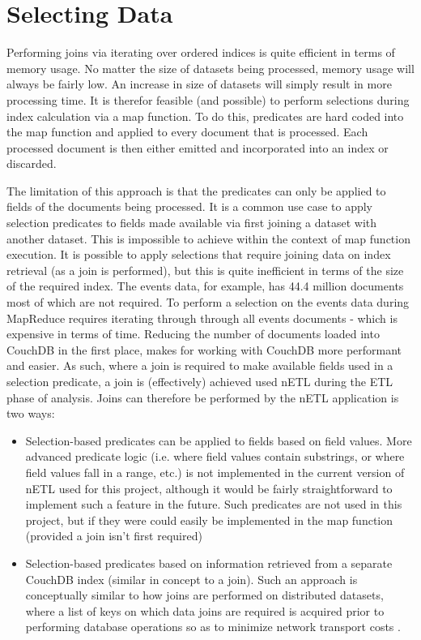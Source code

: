 \section{Selecting Data}
Performing joins via iterating over ordered indices is quite efficient in terms of memory usage. No matter the size of datasets being processed, memory usage will always be fairly low. An increase in size of datasets will simply result in more processing time. It is therefor feasible (and possible) to perform selections during index calculation via a map function. To do this, predicates are hard coded into the map function and applied to every document that is processed. Each processed document is then either emitted and incorporated into an index or discarded.

The limitation of this approach is that the predicates can only be applied to fields of the documents being processed. It is a common use case to apply selection predicates to fields made available via first joining a dataset with another dataset. This is impossible to achieve within the context of map function execution. It is possible to apply selections that require joining data on index retrieval (as a join is performed), but this is quite inefficient in terms of the size of the required index. The events data, for example, has 44.4 million documents most of which are not required. To perform a selection on the events data during MapReduce requires iterating through through all events documents - which is expensive in terms of time. Reducing the number of documents loaded into CouchDB in the first place, makes for working with CouchDB more performant and easier. As such, where a join is required to make available fields used in a selection predicate, a join is (effectively) achieved used nETL during the ETL phase of analysis. Joins can therefore be performed by the nETL application is two ways:

\begin{itemize}
    \item Selection-based predicates can be applied to fields based on field values. More advanced predicate logic (i.e. where field values contain substrings, or where field values fall in a range, etc.) is not implemented in the current version of nETL used for this project, although it would be fairly straightforward to implement such a feature in the future. Such predicates are not used in this project, but if they were could easily be implemented in the map function (provided a join isn't first required)
    \item Selection-based predicates based on information retrieved from a separate CouchDB index (similar in concept to a join). Such an approach is conceptually similar to how joins are performed on distributed datasets, where a list of keys on which data joins are required is acquired prior to performing database operations so as to minimize network transport costs \cite{sonia2018}.
\end{itemize}

